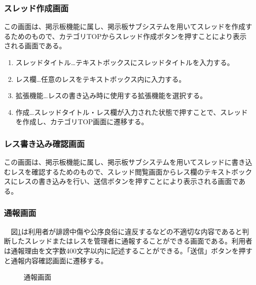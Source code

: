\documentclass[a4j]{jarticle}
\begin{document}
\subsubsection{スレッド作成画面}
この画面は、掲示板機能に属し、掲示板サブシステムを用いてスレッドを作成するためのもので、カテゴリTOPからスレッド作成ボタンを押すことにより表示される画面である。\\
\begin{enumerate}
  \renewcommand{\labelenumi}{\textcircled{\scriptsize \theenumi}}

\item スレッドタイトル…テキストボックスにスレッドタイトルを入力する。

\item レス欄…任意のレスをテキストボックス内に入力する。

\item 拡張機能…レスの書き込み時に使用する拡張機能を選択する。

\item 作成…スレッドタイトル・レス欄が入力された状態で押すことで、スレッドを作成し、カテゴリTOP画面に遷移する。
\end{enumerate}

\subsubsection{レス書き込み確認画面}
この画面は、掲示板機能に属し、掲示板サブシステムを用いてスレッドに書き込むレスを確認するためのもので、スレッド閲覧画面からレス欄のテキストボックスにレスの書き込みを行い、送信ボタンを押すことにより表示される画面である。

\subsubsection{通報画面}
　図\ref{fig:report_reason}は利用者が誹謗中傷や公序良俗に違反するなどの不適切な内容であると判断したスレッドまたはレスを管理者に通報することができる画面である。利用者は通報理由を文字数400文字以内に記述することができる。「送信」ボタンを押すと通報内容確認画面に遷移する。
\begin{figure}[H]
\begin{center}
\caption{通報画面}
\label{fig:report_reason}
\end{center}
\end{figure}
\end{document}
